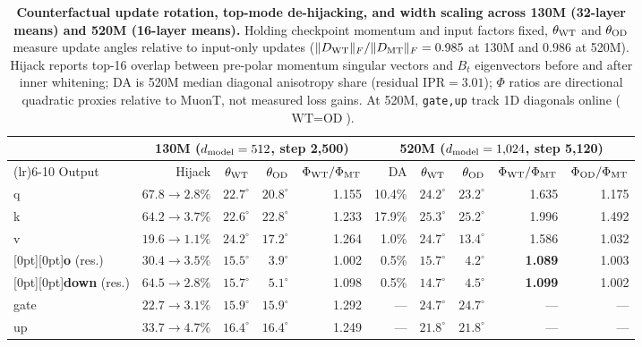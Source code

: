 \begin{table}[!htb]\centering\small
\setlength{\tabcolsep}{4.5pt}
\caption{\textbf{Counterfactual update rotation, top-mode de-hijacking, and width scaling across 130M (32-layer means) and 520M (16-layer means).} Holding checkpoint momentum and input factors fixed, $\theta_{\rm WT}$ and $\theta_{\rm OD}$ measure update angles relative to input-only updates ($\|D_{\rm WT}\|_F/\|D_{\rm MT}\|_F = 0.985$ at 130M and $0.986$ at 520M). Hijack reports top-16 overlap between pre-polar momentum singular vectors and $B_t$ eigenvectors before and after inner whitening; DA is 520M median diagonal anisotropy share (residual $\mathrm{IPR}=3.01$); $\Phi$ ratios are directional quadratic proxies relative to MuonT, not measured loss gains. At 520M, \texttt{gate,up} track 1D diagonals online ($\text{WT}=\text{OD}$).}\label{tab:mechanism_rotation}
\begin{tabularx}{\textwidth}{@{}>{\raggedright\arraybackslash}Xrrrrrrrrr@{}}
\toprule
& \multicolumn{4}{c}{130M ($d_{\mathrm{model}}=512$, step 2,500)} & \multicolumn{5}{c}{520M ($d_{\mathrm{model}}=1{,}024$, step 5,120)} \\
\cmidrule(lr){2-5}\cmidrule(lr){6-10}
Output & Hijack & $\theta_{\rm WT}$ & $\theta_{\rm OD}$ & $\Phi_{\rm WT}/\Phi_{\rm MT}$ & DA & $\theta_{\rm WT}$ & $\theta_{\rm OD}$ & $\Phi_{\rm WT}/\Phi_{\rm MT}$ & $\Phi_{\rm OD}/\Phi_{\rm MT}$ \\
\midrule
q & $67.8\to2.8\%$ & $22.7^\circ$ & $20.8^\circ$ & 1.155 & 10.4\% & $24.2^\circ$ & $23.2^\circ$ & 1.635 & 1.175 \\
k & $64.2\to3.7\%$ & $22.6^\circ$ & $22.8^\circ$ & 1.233 & 17.9\% & $25.3^\circ$ & $25.2^\circ$ & 1.996 & 1.492 \\
v & $19.6\to1.1\%$ & $24.2^\circ$ & $17.2^\circ$ & 1.264 & 1.0\% & $24.7^\circ$ & $13.4^\circ$ & 1.586 & 1.032 \\
\addlinespace[2.5pt]
\rowcolor{rowtint}[0pt][0pt]\textbf{o} (res.) & $30.4\to3.5\%$ & $15.5^\circ$ & $3.9^\circ$ & 1.002 & 0.5\% & $\mathbf{15.7^\circ}$ & $4.2^\circ$ & \textbf{1.089} & 1.003 \\
\rowcolor{rowtint}[0pt][0pt]\textbf{down} (res.) & $64.5\to2.8\%$ & $15.7^\circ$ & $5.1^\circ$ & 1.098 & 0.5\% & $\mathbf{14.7^\circ}$ & $4.5^\circ$ & \textbf{1.099} & 1.002 \\
\addlinespace[2.5pt]
gate & $22.7\to3.1\%$ & $15.9^\circ$ & $15.9^\circ$ & 1.292 & --- & $24.7^\circ$ & $24.7^\circ$ & --- & --- \\
up & $33.7\to4.7\%$ & $16.4^\circ$ & $16.4^\circ$ & 1.249 & --- & $21.8^\circ$ & $21.8^\circ$ & --- & --- \\
\bottomrule\end{tabularx}
\end{table}
